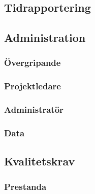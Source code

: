 \documentclass[a4paper]{article}
\begin{document}
\subsection{Tidrapportering}








\subsection{Administration}
\subsubsection{Övergripande}

\subsubsection{Projektledare}

\subsubsection{Administratör}

\subsubsection{Data}


\subsection{Kvalitetskrav}

\subsubsection{Prestanda}

\end{document}
